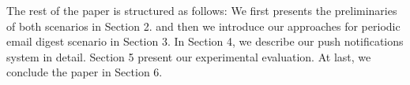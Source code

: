 The rest of the paper is structured as follows: We first presents the preliminaries of both scenarios in Section 2. and then we introduce our approaches for periodic email digest scenario in Section 3. In Section 4, we describe our push notifications system in detail. Section 5 present our experimental evaluation. At last, we conclude the paper in Section 6.